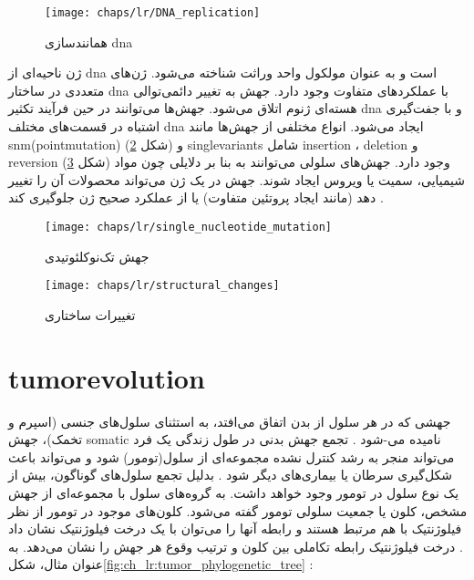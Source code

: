 \begin{figure}[!ht]
	\centerline{\texttt{[image: chaps/lr/DNA\_replication]}}
	\caption{همانندسازی \gls{dna}}
	\label{fig:ch_lr:DNA_replication}
\end{figure}





ژن ناحیه‌ای از \gls{dna} است و به عنوان مولکول واحد وراثت شناخته می‌شود. ژن‌های متعددی در ساختار \gls{dna} با عملکرد‌های متفاوت وجود دارد. جهش به تغییر دائمی‌توالی هسته‌ای ژنوم اتلاق می‌شود. جهش‌ها می‌توانند در حین فرآیند تکثیر \gls{dna} و با جفت‌گیری اشتباه در قسمت‌های مختلف \gls{dna} ایجاد می‌شود. انواع مختلفی از جهش‌ها مانند \gls{snm}(\gls{pointmutation})  (شکل \ref{fig:ch_lr:single_nucleotide_mutation}) و  \glspl{singlevariant}  شامل \gls{insertion} ، \gls{deletion}  و \gls{reversion}  (شکل \ref{fig:ch_lr:structural_changes}) وجود دارد. جهش‌های سلولی می‌توانند به بنا بر دلایلی چون مواد شیمیایی، سمیت یا ویروس ایجاد شوند. جهش در یک ژن می‌تواند محصولات آن را تغییر دهد (مانند ایجاد پروتئین متفاوت) یا از عملکرد صحیح ژن جلوگیری کند \cite{alberts2002molecular}.




\begin{figure}[!ht]
	\centerline{\texttt{[image: chaps/lr/single\_nucleotide\_mutation]}}
	\caption{جهش تک‌نوکلئوتیدی}
	\label{fig:ch_lr:single_nucleotide_mutation}
\end{figure}



\begin{figure}[!ht]
	\centerline{\texttt{[image: chaps/lr/structural\_changes]}}
	\caption{تغییرات ساختاری}
	\label{fig:ch_lr:structural_changes}
\end{figure}




\section{\gls{tumorevolution}}


جهشی که در هر سلول از بدن اتفاق می‌افتد، به استثنای سلول‌های جنسی (اسپرم و تخمک)، جهش \gls{somatic}  نامیده می-شود \cite{somaticMutation}. تجمع جهش بدنی در طول زندگی یک فرد می‌تواند منجر به رشد کنترل نشده مجموعه‌ای از سلول(تومور) شود \cite{nowell1976clonal} و می‌تواند باعث شکل‌گیری سرطان یا بیماری‌های دیگر شود \cite{somaticMutation}. بدلیل تجمع سلول‌های گوناگون، بیش از یک نوع سلول در تومور وجود خواهد داشت. به گروه‌های سلول با مجموعه‌ای از جهش مشخص، کلون یا جمعیت سلولی تومور گفته می‌شود. کلون‌های موجود در تومور از نظر فیلوژنتیک با هم مرتبط هستند و رابطه آنها را می‌توان با یک درخت فیلوژنتیک نشان داد \cite{birbrair2014type}. درخت فیلوژنتیک رابطه تکاملی بین کلون و ترتیب وقوع هر جهش را نشان می‌دهد. به عنوان مثال، شکل\ref{fig:ch_lr:tumor_phylogenetic_tree} :

